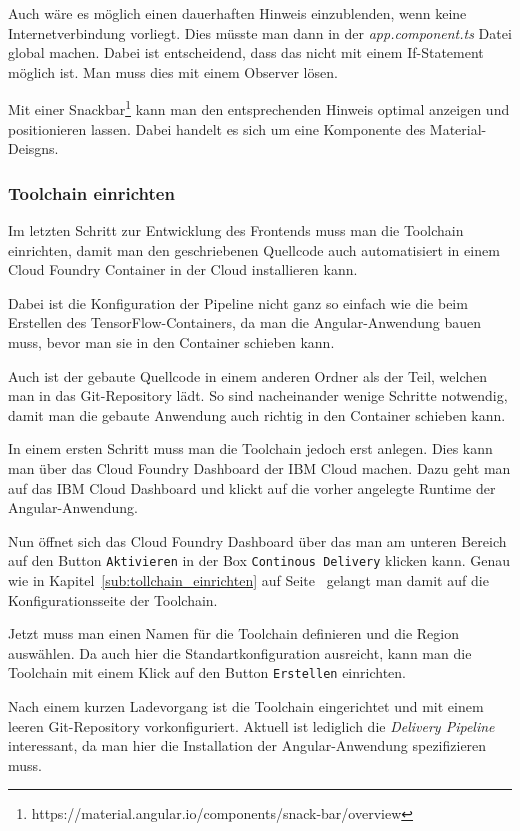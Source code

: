 Auch wäre es möglich einen dauerhaften Hinweis einzublenden, wenn keine Internetverbindung vorliegt. Dies müsste man
dann in der \textit{app.component.ts} Datei global machen. Dabei ist entscheidend, dass das nicht mit einem If-Statement
möglich ist. Man muss dies mit einem Observer lösen.

Mit einer Snackbar\footnote{https://material.angular.io/components/snack-bar/overview} kann man den entsprechenden
Hinweis optimal anzeigen und positionieren lassen. Dabei handelt es sich um eine Komponente des Material-Deisgns.

\subsubsection{Toolchain einrichten}
\label{subsec:toolchain_einrichten}
Im letzten Schritt zur Entwicklung des Frontends muss man die Toolchain einrichten, damit man den geschriebenen
Quellcode auch automatisiert in einem Cloud Foundry Container in der Cloud installieren kann.

Dabei ist die Konfiguration der Pipeline nicht ganz so einfach wie die beim Erstellen des TensorFlow-Containers, da man
die Angular-Anwendung bauen muss, bevor man sie in den Container schieben kann.

Auch ist der gebaute Quellcode in einem anderen Ordner als der Teil, welchen man in das Git-Repository lädt. So sind
nacheinander wenige Schritte notwendig, damit man die gebaute Anwendung auch richtig in den Container schieben kann.

In einem ersten Schritt muss man die Toolchain jedoch erst anlegen. Dies kann man über das Cloud Foundry Dashboard der
IBM Cloud machen. Dazu geht man auf das IBM Cloud Dashboard und klickt auf die vorher angelegte Runtime der
Angular-Anwendung.

Nun öffnet sich das Cloud Foundry Dashboard über das man am unteren Bereich auf den Button \texttt{Aktivieren} in der
Box \texttt{Continous Delivery} klicken kann. Genau wie in Kapitel~\ref{sub:tollchain_einrichten} auf
Seite~\pageref{sub:tollchain_einrichten} gelangt man damit auf die Konfigurationsseite der Toolchain.

Jetzt muss man einen Namen für die Toolchain definieren und die Region auswählen. Da auch hier die Standartkonfiguration
ausreicht, kann man die Toolchain mit einem Klick auf den Button \texttt{Erstellen} einrichten.

Nach einem kurzen Ladevorgang ist die Toolchain eingerichtet und mit einem leeren Git-Repository vorkonfiguriert.
Aktuell ist lediglich die \textit{Delivery Pipeline} interessant, da man hier die Installation der Angular-Anwendung
spezifizieren muss.

